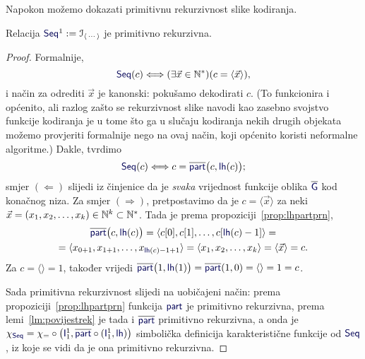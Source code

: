 Napokon možemo dokazati primitivnu rekurzivnost slike kodiranja.

\begin{korolar}\label{kor:Seqprn}
    Relacija $\f{Seq}^1:=\im{\langle\,\cdots\rangle}$ je primitivno rekurzivna.
\end{korolar}
\begin{proof}
Formalnije,  \begin{equation}
    \f{Seq}(c)\Longleftrightarrow(\exists\vec x\in\N^*)(c=\langle\vec x\rangle)\text,
\end{equation}
i način za odrediti $\vec x$ je kanonski: pokušamo dekodirati $c$. (To funkcionira i općenito, ali razlog zašto se rekurzivnost slike navodi kao zasebno svojstvo funkcije kodiranja je u tome što ga u slučaju kodiranja nekih drugih objekata možemo provjeriti formalnije nego na ovaj način, koji općenito koristi neformalne algoritme.) Dakle, tvrdimo
\begin{equation}
    \f{Seq}(c)\Longleftrightarrow c=\overline{\f{part}}\bigl(c,\f{lh}(c)\bigr)\text;
\end{equation}
smjer $(\Leftarrow)$ slijedi iz činjenice da je \emph{svaka} vrijednost funkcije oblika $\overline{\f G}$ kod konačnog niza. Za smjer $(\Rightarrow)$, pretpostavimo da je $c=\langle\vec x\rangle$ za neki $\vec x=(x_1,x_2,\dotsc,x_k)\in{\mathbb N}^k\subset{\mathbb N}^*$. Tada je prema propoziciji~\ref{prop:lhpartprn},
\begin{multline}
    \overline{\f{part}}\bigl(c,\f{lh}(c)\bigr)=\langle c[0],c[1],\dotsc,c[\f{lh}(c)-1]\rangle=\\
    =\langle x_{0+1},x_{1+1},\dotsc,x_{\f{lh}(c)-1+1}\rangle=\langle x_1,x_2,\dotsc,x_k\rangle=\langle\vec x\rangle=c\text.
\end{multline}
Za $c=\langle\rangle=1$, također vrijedi $\overline{\f{part}}\bigl(1,\f{lh}(1)\bigr)=\overline{\f{part}}(1,0)=\langle\rangle=1=c$.

Sada primitivna rekurzivnost slijedi na uobičajeni način: prema propoziciji~\ref{prop:lhpartprn} funkcija $\f{part}$ je primitivno rekurzivna, prema lemi~\ref{lm:povijestrek} je tada i $\overline{\f{part}}$ primitivno rekurzivna, a onda je $\chi_{\f{Seq}}=\chi_=\circ\bigl(\f I_1^1,\overline{\f{part}}\circ(\f I_1^1,\f{lh})\bigr)$ simbolička definicija karakteristične funkcije od $\f{Seq}$, iz koje se vidi da je ona primitivno rekurzivna.
\end{proof}

